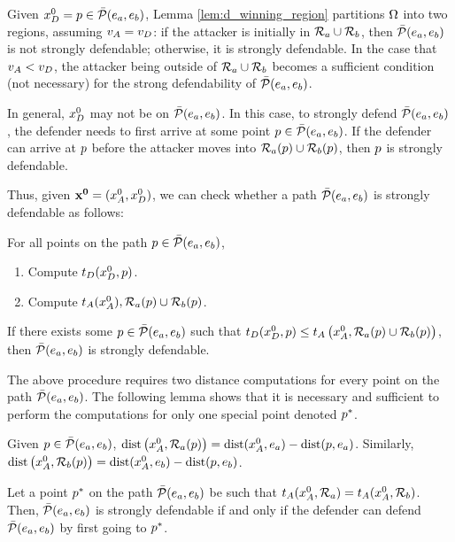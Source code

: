 Given $x_D^0=p\in\bar{\mathcal{P}}(e_a,e_b)$, Lemma \ref{lem:d_winning_region} partitions $\Omega$ into two regions, assuming $v_A=v_D$: if the attacker is initially in $\mathcal{R}_a \cup \mathcal{R}_b$, then $\bar{\mathcal{P}}(e_a,e_b)$ is not strongly defendable; otherwise, it is strongly defendable. In the case that $v_A<v_D$, the attacker being outside of $\mathcal{R}_a \cup \mathcal{R}_b$ becomes a sufficient condition (not necessary) for the strong defendability of $\bar{\mathcal{P}}(e_a,e_b)$.

In general, $x_D^0$ may not be on $\bar{\mathcal{P}}(e_a,e_b)$. In this case, to strongly defend $\bar{\mathcal{P}}(e_a,e_b)$, the defender needs to first arrive at some point $p\in\bar{\mathcal{P}}(e_a,e_b)$. If the defender can arrive at $p$ before the attacker moves into $\mathcal{R}_a(p)\cup\mathcal{R}_b(p)$, then $p$ is strongly defendable. 

Thus, given $\mathbf{x^0} = (x_A^0,x_D^0)$, we can check whether a path $\bar{\mathcal{P}}(e_a,e_b)$ is strongly defendable as follows:

For all points on the path $p\in\bar{\mathcal{P}}(e_a,e_b)$,
\begin{enumerate}
\item Compute $t_D(x_D^0, p)$.
\item Compute $t_A(x_A^0),\mathcal{R}_a(p)\cup\mathcal{R}_b(p)$.
\end{enumerate}
If there exists some $p\in\bar{\mathcal{P}}(e_a,e_b)$ such that $t_D(x_D^0, p)\le t_A\left(x_A^0,\mathcal{R}_a(p)\cup\mathcal{R}_b(p)\right)$, then $\bar{\mathcal{P}}(e_a,e_b)$ is strongly defendable. 

The above procedure requires two distance computations for every point on the path $\bar{\mathcal{P}}(e_a,e_b)$. The following lemma shows that it is necessary and sufficient to perform the computations for only one special point denoted $p^*$.

\begin{rem} \label{rem:time_to_region_a}
Given $p\in\bar{\mathcal{P}}(e_a,e_b)$, $\text{dist}\left(x_A^0,\mathcal{R}_a(p)\right) = \text{dist}(x_A^0,e_a) - \text{dist}(p,e_a)$. Similarly, $\text{dist}\left(x_A^0,\mathcal{R}_b(p)\right) = \text{dist}(x_A^0,e_b) - \text{dist}(p,e_b)$.
\end{rem}

\begin{lem} \label{lem:pstar}
Let a point $p^*$ on the path $\bar{\mathcal{P}}(e_a,e_b)$ be such that $t_A(x_A^0,\mathcal{R}_a)=t_A(x_A^0,\mathcal{R}_b)$. Then, $\bar{\mathcal{P}}(e_a,e_b)$ is strongly defendable if and only if the defender can defend $\bar{\mathcal{P}}(e_a,e_b)$ by first going to $p^*$.
\end{lem}

